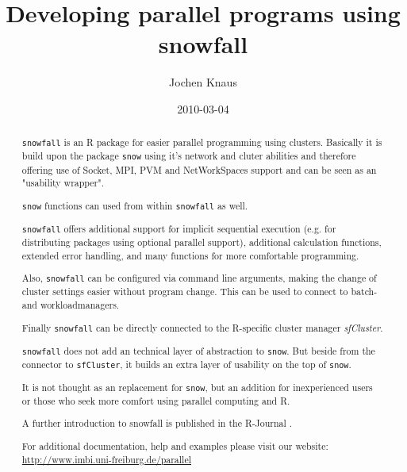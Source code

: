 \documentclass[10pt,oneside]{article}
\begin{document}
\pagestyle{empty}

\setlength{\baselineskip}{1.25em}
\setlength{\parskip}{0.5em}
\setlength{\parindent}{0.0em}
\begin{titlepage}
\title{Developing parallel programs using snowfall}
\author{Jochen Knaus}
\date{2010-03-04}
\maketitle

\begin{abstract}
\texttt{snowfall} is an R package for easier parallel programming
using clusters.
Basically it is build upon the package \texttt{snow} \cite{TIERNEY08} using it's
network and cluter abilities and therefore offering use of
Socket, MPI, PVM and NetWorkSpaces support and can be seen as an
"usability wrapper".

\texttt{snow} functions can used from within \texttt{snowfall} as well.

\texttt{snowfall} offers additional support for implicit sequential
execution (e.g. for distributing packages using optional parallel
support), additional calculation functions, extended error handling,
and many functions for more comfortable programming.

Also, \texttt{snowfall} can be configured via command line
arguments, making the change of cluster settings easier without
program change. This can be used to connect to batch- and workloadmanagers.

Finally \texttt{snowfall} can be directly connected to the R-specific
cluster manager \emph{sfCluster}.

\texttt{snowfall} does not add an technical layer of abstraction
to \texttt{snow}. But beside from the connector to \texttt{sfCluster}, it
builds an extra layer of usability on the top of \texttt{snow}.

It is not thought as an replacement for \texttt{snow}, but an addition for
inexperienced users or those who seek more comfort using parallel
computing and R.

A further introduction to snowfall is published in the R-Journal
\cite{Knau:Porz:Bind:Schw:easi:2009}.

For additional documentation, help and examples please visit our website:
\url{http://www.imbi.uni-freiburg.de/parallel}

\end{abstract}
\end{titlepage}
\end{document}
